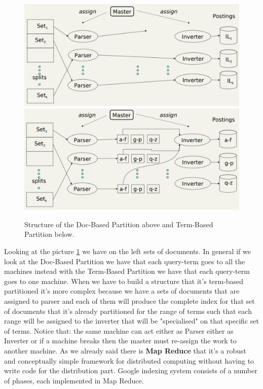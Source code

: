 \begin{figure}
    \centering
    \includegraphics[width=0.75\linewidth]{images/docbasedpartition.png}
    \includegraphics[width=0.75\linewidth]{images/termbased.png}
    \caption{Structure of the Doc-Based Partition above and Term-Based Partition below.}
    \label{fig:doctermbased}
\end{figure}
Looking at the picture \ref{fig:doctermbased} we have on the left sets of documents. In general if we look at the Doc-Based Partition we have that each query-term goes to all the machines instead with the Term-Based Partition we have that each query-term goes to one machine.\newline
When we have to build a structure that it's term-based partitioned it's more complex because we have a sets of documents that are assigned to parser and each of them will produce the complete index for that set of documents that it's already partitioned for the range of terms such that each range will be assigned to the inverter that will be "specialised" on that specific set of terms.\newline
Notice that: the same machine can act either as Parser either as Inverter or if a machine breaks then the master must re-assign the work to another machine.
As we already said there is \textbf{Map Reduce} that it's a robust and conceptually simple framework for distributed computing without having to write code for the distribution part.\newline
Google indexing system consists of a number of phases, each implemented in Map Reduce.
